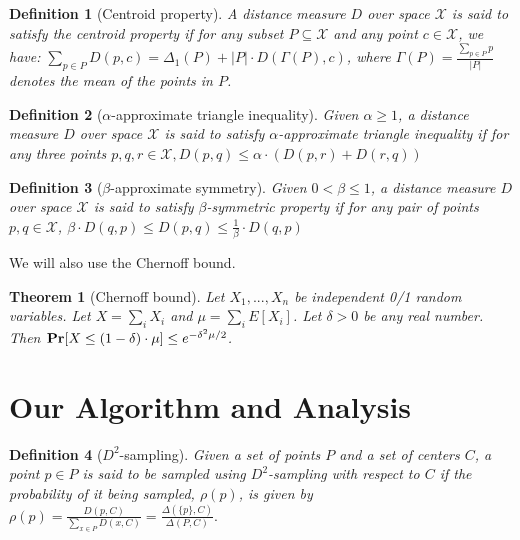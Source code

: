 \documentclass[11pt]{article}
\newtheorem{theorem}{Theorem}
\newtheorem{definition}{Definition}
\newcommand{\pr}{{\bf Pr}}
\begin{document}
\begin{definition}[Centroid property]
A distance measure $D$ over space $\mathcal{X}$ is said to satisfy the centroid property if for any subset $P \subseteq \mathcal{X}$ and any point $c \in \mathcal{X}$, we have: $\sum_{p \in P} D(p, c) = \Delta_{1}(P) + |P| \cdot D(\Gamma(P), c)$,
where $\Gamma(P) = \frac{\sum_{p \in P} p}{|P|}$ denotes the mean of the points in $P$.
\end{definition}

\begin{definition}[$\alpha$-approximate triangle inequality]
Given $\alpha \geq 1$, a distance measure $D$ over space $\mathcal{X}$ is said to satisfy $\alpha$-approximate triangle inequality if for any three points $p, q, r \in \mathcal{X},
D(p, q) \leq \alpha \cdot (D(p, r) + D(r, q))$
\end{definition}

\begin{definition}[$\beta$-approximate symmetry]
Given $0 < \beta \leq 1$, a distance measure $D$ over space $\mathcal{X}$ is said to satisfy $\beta$-symmetric property if for any pair of points $p, q \in \mathcal{X}$, $\beta \cdot D(q, p) \leq D(p, q) \leq \frac{1}{\beta} \cdot D(q, p) $
\end{definition}

\noindent
We will also use the Chernoff bound.
\begin{theorem}[Chernoff bound]\label{thm:chernoff}
Let $X_1, ..., X_n$ be independent 0/1 random variables. Let $X = \sum_{i} X_i$ and $\mu = \sum_i E[X_i]$. 
Let $\delta > 0$ be any real number. Then  $\pr[X \leq (1 - \delta) \cdot \mu] \leq e^{-\delta^2 \mu/2}$.
\end{theorem}






\section{Our Algorithm and Analysis}
\label{sec:algo-analysis}

\begin{definition}[$D^2$-sampling]
Given a set of points $P$ and a set of centers $C$, a point $p \in P$ is said to be sampled using {\em $D^2$-sampling}
with respect to $C$ if the probability of it being sampled, $\rho(p)$,  is given by
$\rho(p) = \frac{D(p,C)}{\sum_{x \in P} D(x,C)} = \frac{\Delta(\{p\}, C)}{\Delta(P,C)}.$
\end{definition}
\end{document}
